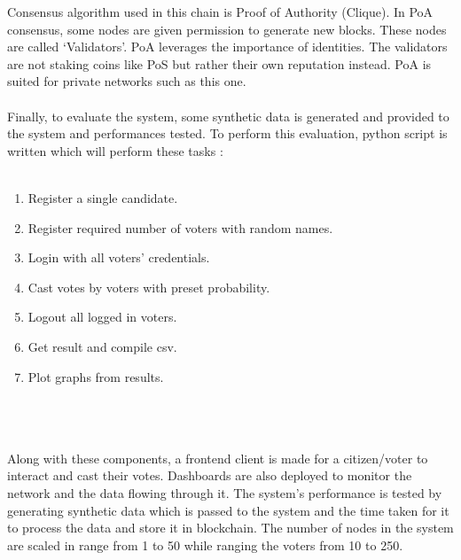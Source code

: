 \documentclass[10pt,final,journal,a4paper,oneside,twocolumn]{IEEEtran}
\begin{document}
		Consensus algorithm used in this chain is Proof of Authority (Clique). In PoA consensus, some nodes are given permission to generate new blocks. These nodes are called ‘Validators’. PoA leverages the importance of identities. The validators are not staking coins like PoS but rather their own reputation instead. PoA is suited for private networks such as this one.
		\\\\Finally, to evaluate the system, some synthetic data is generated and provided to the system and performances tested. To perform this evaluation, python script is written which will perform these tasks :
		\\\\\colorbox{gray!20}{%
	        \begin{minipage}{\linewidth}%
	            \vspace*{2pt}
            	\begin{enumerate}
            		\item Register a single candidate.
            		\item Register required number of voters with random names.
            		\item Login with all voters’ credentials.
	           		\item Cast votes by voters with preset probability.
	           		\item Logout all logged in voters.
	           		\item Get result and compile csv.
            		\item Plot graphs from results.
            	\end{enumerate}
	            \vspace*{2pt}
	        \end{minipage}%
    	}
	    \\\\\\Along with these components, a frontend client is made for a citizen/voter to interact and cast their votes. Dashboards are also deployed to monitor the network and the data flowing through it. The system’s performance is tested by generating synthetic data which is passed to the system and the time taken for it to process the data and store it in blockchain. The number of nodes in the system are scaled in range from 1 to 50 while ranging the voters from 10 to 250.
\end{document}

